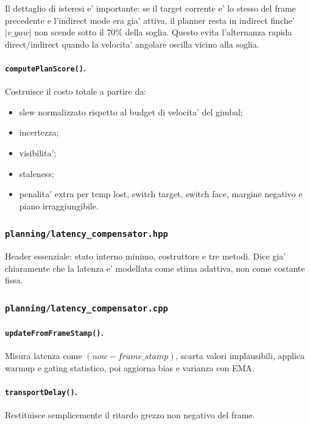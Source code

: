 \documentclass[11pt,a4paper]{article}
\newcommand{\code}[1]{\texttt{#1}}
\begin{document}
Il dettaglio di isteresi e' importante: se il target corrente e' lo stesso del frame precedente e l'indirect mode era gia' attiva, il planner resta in indirect finche' \(|v\_yaw|\) non scende sotto il \(70\%\) della soglia. Questo evita l'alternanza rapida direct/indirect quando la velocita' angolare oscilla vicino alla soglia.

\paragraph{\code{computePlanScore()}.}
Costruisce il costo totale a partire da:
\begin{itemize}[leftmargin=1.4em]
  \item slew normalizzato rispetto al budget di velocita' del gimbal;
  \item incertezza;
  \item visibilita';
  \item staleness;
  \item penalita' extra per temp lost, switch target, switch face, margine negativo e piano irraggiungibile.
\end{itemize}

\subsubsection{\code{planning/latency\_compensator.hpp}}

Header essenziale: stato interno minimo, costruttore e tre metodi. Dice gia' chiaramente che la latenza e' modellata come stima adattiva, non come costante fissa.

\subsubsection{\code{planning/latency\_compensator.cpp}}

\paragraph{\code{updateFromFrameStamp()}.}
Misura latenza come \((now - frame\_stamp)\), scarta valori implausibili, applica warmup e gating statistico, poi aggiorna bias e varianza con EMA.

\paragraph{\code{transportDelay()}.}
Restituisce semplicemente il ritardo grezzo non negativo del frame.
\end{document}
